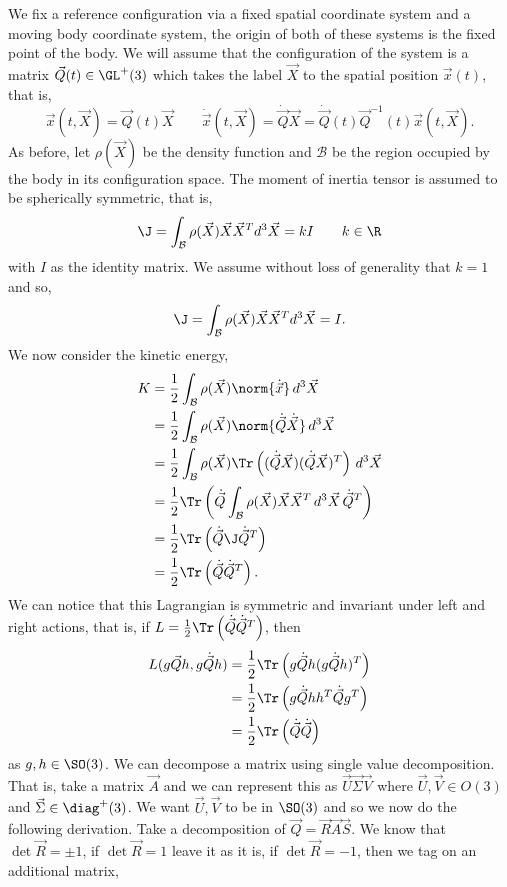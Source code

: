 \noindent
We fix a reference configuration via a fixed spatial coordinate system and a moving body coordinate system, the origin of both of these systems is the fixed point of the body. We will assume that the configuration of the system is a matrix $\vec Q(t) \in \GL^+(3)$ which takes the label $\vec X$ to the spatial position $\vec x(t)$, that is,
$$ \vec x(t, \vec X) = \vec Q(t)\vec X \qquad \dot{\vec x}(t, \vec X) = \dot{\vec Q}\vec X = \dot{\vec Q}(t)\vec Q^{-1}(t)\vec x(t, \vec X). $$
As before, let $\rho(\vec X)$ be the density function and $\mathcal{B}$ be the region occupied by the body in its configuration space. The moment of inertia tensor is assumed to be spherically symmetric, that is,
$$ \J = \int_{\mathcal{B}} \rho(\vec X)\vec X\vec X^T d^3\vec X = kI \qquad k \in \R $$
with $I$ as the identity matrix. We assume without loss of generality that $k = 1$ and so,
$$ \J = \int_{\mathcal{B}} \rho(\vec X)\vec X\vec X^T d^3\vec X = I. $$
We now consider the kinetic energy,
\begin{align*}
  K &= \frac{1}{2}\int_{\mathcal{B}} \rho(\vec X) \norm{\dot{\vec x}}\, d^3 \vec X \\
  &= \frac{1}{2}\int_{\mathcal{B}} \rho(\vec X) \norm{\dot{\vec Q}\dot{\vec X}}\, d^3 \vec X \\
  &= \frac{1}{2}\int_{\mathcal{B}} \rho(\vec X) \Tr\left( (\dot{\vec Q}\vec X)(\dot{\vec Q}\vec X)^T \right)\, d^3 \vec X \\
  &= \frac{1}{2}\Tr\left(\dot{\vec Q}\int_{\mathcal{B}} \rho(\vec X) \vec X\vec X^T \, d^3 \vec X\, \dot{\vec Q}^T \right)\\
  &= \frac{1}{2}\Tr\left( \dot{\vec Q}\J\dot{\vec Q}^T \right) \\
  &= \frac{1}{2}\Tr\left( \dot{\vec Q}\dot{\vec Q}^T \right).
\end{align*}
We can notice that this Lagrangian is symmetric and invariant under left and right actions, that is, if $L = \frac{1}{2}\Tr\left(\dot{\vec Q}\dot{\vec Q}^T\right)$, then \begin{align*}
  L(g\vec{Q}h, g\dot{\vec Q}h) &= \frac{1}{2}\Tr\left( g\dot{\vec Q}h(g\dot{\vec Q}h)^T \right) \\
  &= \frac{1}{2}\Tr\left( g\dot{\vec Q}hh^T\dot{\vec Q}g^T \right) \\
  &= \frac{1}{2}\Tr\left( \dot{\vec Q}\dot{\vec Q} \right)
\end{align*}
as $g, h \in \SO(3)$.
We can decompose a matrix using single value decomposition. That is, take a matrix $\vec A$ and we can represent this as $\vec U\vec \Sigma \vec V$ where $\vec U, \vec V \in O(3)$ and $\vec\Sigma \in \diag^+(3)$. We want $\vec U, \vec V$ to be in $\SO(3)$ and so we now do the following derivation. Take a decomposition of $\vec Q = \vec R\vec A\vec S$. We know that $\det \vec R = \pm 1$, if $\det \vec R = 1$ leave it as it is, if $\det \vec R = -1$, then we tag on an additional matrix,
